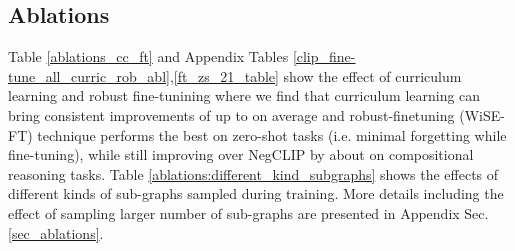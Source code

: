 \documentclass[11pt]{article}
\newcommand{\negclip}{NegCLIP}
\begin{document}
\subsection{Ablations}
\label{abl_main_paper}
Table \ref{ablations_cc_ft} and Appendix Tables \ref{clip_fine-tune_all_curric_rob_abl},\ref{ft_zs_21_table} show the effect of curriculum learning and robust fine-tunining where we find that curriculum learning can bring consistent improvements of up to  on average and robust-finetuning (WiSE-FT) technique performs the best on zero-shot tasks (i.e. minimal forgetting while fine-tuning), while still improving over \negclip{} by about  on compositional reasoning tasks. Table \ref{ablations:different_kind_subgraphs} shows the effects of different kinds of sub-graphs sampled during training. 
More details including the effect of sampling larger number of sub-graphs are presented in Appendix Sec. \ref{sec_ablations}.
\end{document}
